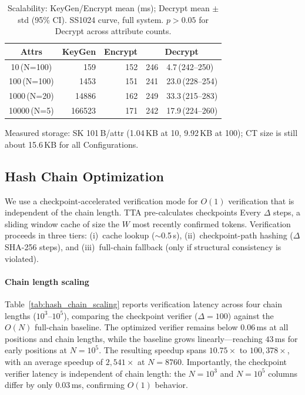 \documentclass[lettersize,journal]{IEEEtran}
\begin{document}
\begin{table}[!t]
\renewcommand{\arraystretch}{1.1}
\caption{Scalability: KeyGen/Encrypt mean (ms); Decrypt mean $\pm$ std (95\% CI). SS1024 curve, full system. $p > 0.05$ for Decrypt across attribute counts.}
\label{tab:scalability}
\centering
\footnotesize
\begin{tabular}{c r r r@{$\pm$}l}
\toprule
\textbf{Attrs} & \textbf{KeyGen} & \textbf{Encrypt} & \multicolumn{2}{c}{\textbf{Decrypt}} \\
\midrule
10\,(N=100) & 159 & 152 & 246 & 4.7\,(242--250) \\
100\,(N=100) & 1453 & 151 & 241 & 23.0\,(228--254) \\
1000\,(N=20) & 14886 & 162 & 249 & 33.3\,(215--283) \\
10000\,(N=5) & 166523 & 171 & 242 & 17.9\,(224--260) \\
\bottomrule
\end{tabular}
\end{table}

Measured storage: SK 101\,B/attr (1.04\,KB at 10, 9.92\,KB
at 100); CT size is still about 15.6\,KB for all
Configurations.

\subsection{Hash Chain Optimization}
\label{subsec:hash_chain}

We use a checkpoint-accelerated verification mode for $O(1)$ verification that is independent of the chain length. TTA pre-calculates checkpoints
Every $\Delta$ steps, a sliding window cache of size
the $W$ most recently confirmed tokens. Verification proceeds in
three tiers: (i)~cache lookup ($\sim$0.5\,\textmu s), (ii)~checkpoint-path
hashing ($\Delta$ SHA-256 steps), and (iii)~full-chain fallback (only
if structural consistency is violated).

\paragraph{Chain length scaling}
Table~\ref{tab:hash_chain_scaling} reports verification latency across four chain lengths ($10^3$--$10^5$), comparing the checkpoint verifier ($\Delta=100$) against the $O(N)$ full-chain baseline. The optimized verifier remains below $0.06$\,ms at all positions and chain lengths, while the baseline grows linearly---reaching $43$\,ms for early positions at $N=10^5$. The resulting speedup spans $10.75\times$ to $100,378\times$, with an average speedup of $2,541\times$ at $N=8760$. Importantly, the checkpoint verifier latency is independent of chain length: the $N=10^3$ and $N=10^5$ columns differ by only $0.03$\,ms, confirming $O(1)$ behavior.
\end{document}
